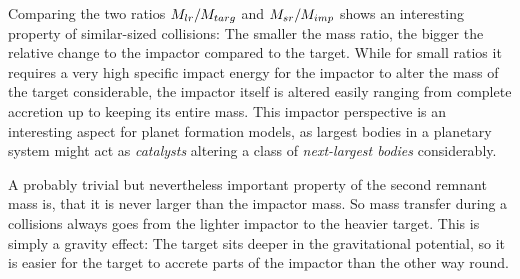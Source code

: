 
Comparing the two ratios $M_{lr} / M_{targ}$ and $M_{sr} / M_{imp}$ shows an interesting property of similar-sized collisions: The smaller the mass ratio, the bigger the relative change to the impactor compared to the target. While for small ratios it requires a very high specific impact energy for the impactor to alter the mass of the target considerable, the impactor itself is altered easily ranging from complete accretion up to keeping its entire mass. This impactor perspective is an interesting aspect for planet formation models, as largest bodies in a planetary system might act as \emph{catalysts} altering a class of \emph{next-largest bodies} \cite{Asphaug:2010p3539} considerably.

A probably trivial but nevertheless important property of the second remnant mass is, that it is never larger than the impactor mass. So mass transfer during a collisions always goes from the lighter impactor to the heavier target. This is simply a gravity effect: The target sits deeper in the gravitational potential, so it is easier for the target to accrete parts of the impactor than the other way round.

